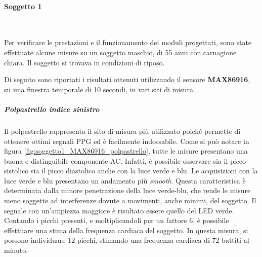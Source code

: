 \clearpage

\paragraph{Soggetto 1}~

\vspace{1cm}

\noindent Per verificare le prestazioni e il funzionamento dei moduli progettati, sono state effettuate alcune misure su un soggetto maschio, di 55 anni con carnagione chiara. Il soggetto si trovava in condizioni di riposo.

\vspace{0.5cm}

\noindent Di seguito sono riportati i risultati ottenuti utilizzando il sensore \textbf{MAX86916}, su una finestra temporale di 10 secondi, in vari siti di misura.

\subparagraph{Polpastrello indice sinistro}

Il polpastrello rappresenta il sito di misura più utilizzato poiché permette di ottenere ottimi segnali PPG ed è facilmente indossabile. Come si può notare in figura \ref{fig:soggetto1_MAX86916_polpastrello}, tutte le misure presentano una buona e distinguibile componente AC. Infatti, è possibile osservare sia il picco sistolico sia il picco diastolico anche con la luce verde e blu. Le acquisizioni con la luce verde e blu presentano un andamento più \textit{smooth}. Questa caratteristica è determinata dalla minore penetrazione della luce verde-blu, che rende le misure meno soggette ad interferenze dovute a movimenti, anche minimi, del soggetto. Il segnale con un'ampiezza maggiore è risultato essere quello del LED verde. Contando i picchi presenti, e moltiplicandoli per un fattore 6, è possibile effettuare una stima della frequenza cardiaca del soggetto. In questa misura, si possono individuare 12 picchi, stimando una frequenza cardiaca di 72 battiti al minuto.


